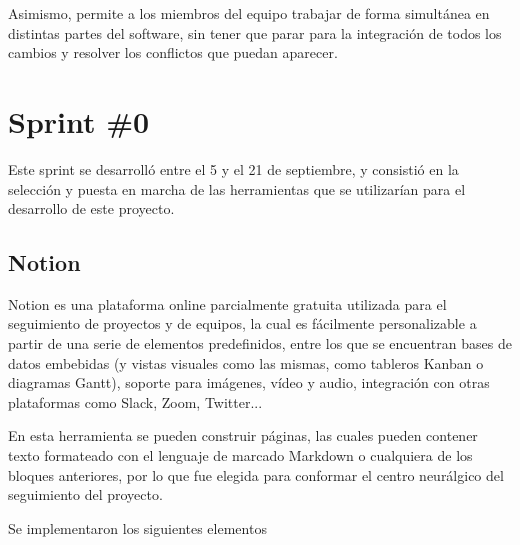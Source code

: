         Asimismo, permite a los miembros del equipo trabajar de forma simultánea en distintas partes del software, sin tener que parar para la integración de todos los cambios y resolver los conflictos que puedan aparecer.
    
    \section{Sprint \#0}
        Este sprint se desarrolló entre el 5 y el 21 de septiembre, y consistió en la selección y puesta en marcha de las herramientas que se utilizarían para el desarrollo de este proyecto.
        
        \subsection{Notion}
            Notion es una plataforma online parcialmente gratuita utilizada para el seguimiento de proyectos y de equipos, la cual es fácilmente personalizable a partir de una serie de elementos predefinidos, entre los que se encuentran bases de datos embebidas (y vistas visuales como las mismas, como tableros Kanban o diagramas Gantt), soporte para imágenes, vídeo y audio, integración con otras plataformas como Slack, Zoom, Twitter...
            
            En esta herramienta se pueden construir páginas, las cuales pueden contener texto formateado con el lenguaje de marcado Markdown o cualquiera de los bloques anteriores, por lo que fue elegida para conformar el centro neurálgico del seguimiento del proyecto.
            
            Se implementaron los siguientes elementos
            
